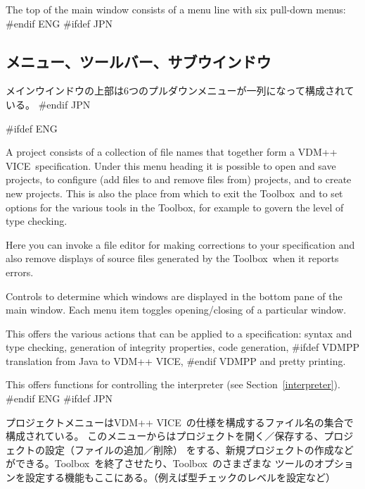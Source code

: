 \documentclass[\pformat,12pt]{article}
\newcommand{\vdmslpp}{VDM-SL}
\newcommand{\Toolbox}{Toolbox}
\newcommand{\vdmslpp}{VDM++}
\newcommand{\Toolbox}{Toolbox}
\renewcommand{\vdmslpp}{VDM++ VICE}
\newcommand{\guicmd}[1]{{\sf #1}}
\newcommand{\guicmd}[1]{{\gt #1}}
\begin{document}
The top of the main window consists of a menu line with six pull-down menus:
#endif ENG
#ifdef JPN
\subsection{メニュー、ツールバー、サブウインドウ}

メインウインドウの上部は6つのプルダウンメニューが一列になって構成されている。
#endif JPN

\begin{description}
#ifdef ENG
\item[\guicmd{Project}:] A project consists of a
  collection of file  
  names that together form a \vdmslpp\ specification. Under this menu
  heading it is possible to open and save projects, to configure (add
  files to and remove files from) projects, and to create new
  projects. This is also the place from which to exit the \Toolbox\
  and to set options for the various tools in the \Toolbox, for
  example to govern the level of type checking.

\item[\guicmd{File}:] Here you can invoke a file editor for making
  corrections to your specification and also remove displays of source
  files generated by the \Toolbox\ when it reports errors.

\item[\guicmd{Windows}:] Controls to determine which windows are
  displayed in the bottom pane of the main window. Each menu item
  toggles opening/closing of a particular window.

\item[\guicmd{Actions}:] This offers the various
  actions that can be applied to a specification: syntax and type
  checking, generation of integrity properties, code generation, 
#ifdef VDMPP 
translation from Java to \vdmslpp, 
#endif VDMPP 
and pretty printing.

\item[\guicmd{Interpreter}:] This offers
  functions for controlling the interpreter (see Section~\ref{interpreter}).
#endif ENG
#ifdef JPN
\item[\guicmd{プロジェクト}:]
  プロジェクトメニューは\vdmslpp\ の仕様を構成するファイル名の集合で構成されている。
  このメニューからはプロジェクトを開く／保存する、プロジェクトの設定（ファイルの追加／削除）
  をする、新規プロジェクトの作成などができる。\Toolbox\ を終了させたり、\Toolbox\ のさまざまな
  ツールのオプションを設定する機能もここにある。（例えば型チェックのレベルを設定など）


\end{description}
\end{document}
